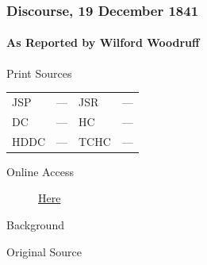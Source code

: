 		\subsubsection{Discourse, 19 December 1841}
			\label{EMS-1841-JS-19-DEC-1841}
			
			\paragraph{As Reported by Wilford Woodruff}
				\label{EMS-1841-JS-19-DEC-1841-WW}
				
				\begin{description}
					\item[Print Sources]
				\end{description}	

				\begin{tabular}{p{0.5in}p{1in}p{0.5in}p{1in}}
					JSP	 	& ---		& JSR 		& --- \\
					DC	 	& ---		& HC 		& --- \\
					HDDC 	& ---		& TCHC 		& --- \\
				\end{tabular}
				
				\begin{description}
					\item[Online Access] \href{https://www.josephsmithpapers.org/paper-summary/letter-to-church-leaders-in-kirtland-ohio-15-december-1841/1}{Here}
				\end{description}
				
				\begin{description}
					\item[Background]
				\end{description}
				
				
				\begin{description}
					\item[Original Source]
				\end{description}
				
